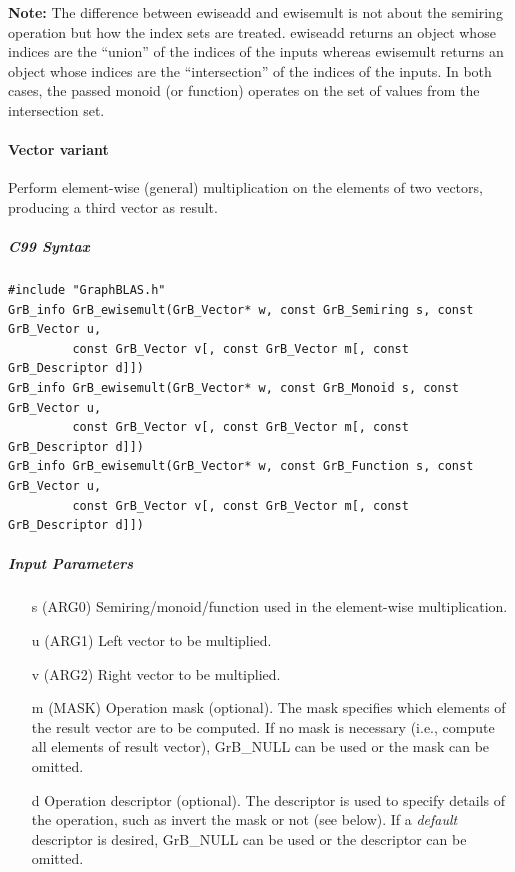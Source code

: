 \documentclass[11pt]{extarticle}
\begin{document}
{\bf Note:} The difference between {\sf ewiseadd} and {\sf ewisemult} is not about the semiring operation but how the index sets are treated.
 {\sf ewiseadd} returns an object whose indices are the ``union'' of the indices of the inputs whereas  
 {\sf ewisemult} returns an object whose indices are the ``intersection'' of the indices of the inputs. In both cases, the passed monoid (or function) operates on the 
 set of values from the intersection set. 
 
\paragraph{Vector variant}

Perform element-wise (general) multiplication on the elements of two vectors,
producing a third vector as result.

\subparagraph{C99 Syntax}

\begin{verbatim}
#include "GraphBLAS.h"
GrB_info GrB_ewisemult(GrB_Vector* w, const GrB_Semiring s, const GrB_Vector u,
         const GrB_Vector v[, const GrB_Vector m[, const GrB_Descriptor d]])
GrB_info GrB_ewisemult(GrB_Vector* w, const GrB_Monoid s, const GrB_Vector u,
         const GrB_Vector v[, const GrB_Vector m[, const GrB_Descriptor d]])
GrB_info GrB_ewisemult(GrB_Vector* w, const GrB_Function s, const GrB_Vector u,
         const GrB_Vector v[, const GrB_Vector m[, const GrB_Descriptor d]])
\end{verbatim}

\subparagraph{Input Parameters}

\begin{itemize}
	\item[{\sf s}] ({\sf ARG0}) Semiring/monoid/function used in the element-wise multiplication.

	\item[{\sf u}] ({\sf ARG1}) Left vector to be multiplied.

	\item[{\sf v}] ({\sf ARG2}) Right vector to be multiplied.

	\item[{\sf m}] ({\sf MASK}) Operation mask (optional). The mask
	specifies which elements of the result vector are to be computed.
	If no mask is necessary (i.e., compute all elements of result
	vector), {\sf GrB\_NULL} can be used or the mask can be omitted.

	\item[{\sf d}] Operation descriptor (optional). The descriptor
	is used to specify details of the operation, such as 
	invert the mask or not (see below). If a
	\emph{default} descriptor is desired, {\sf GrB\_NULL} can be
	used or the descriptor can be omitted.
\end{itemize}
\end{document}
